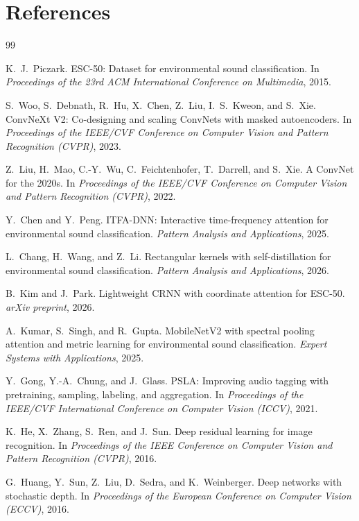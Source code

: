 \documentclass{article}
\begin{document}
\section*{References}
{\small
\begin{thebibliography}{99}

K.~J.~Piczark.
ESC-50: Dataset for environmental sound classification.
In \textit{Proceedings of the 23rd ACM International Conference on Multimedia}, 2015.

S.~Woo, S.~Debnath, R.~Hu, X.~Chen, Z.~Liu, I.~S.~Kweon, and S.~Xie.
ConvNeXt V2: Co-designing and scaling ConvNets with masked autoencoders.
In \textit{Proceedings of the IEEE/CVF Conference on Computer Vision and Pattern Recognition (CVPR)}, 2023.

Z.~Liu, H.~Mao, C.-Y.~Wu, C.~Feichtenhofer, T.~Darrell, and S.~Xie.
A ConvNet for the 2020s.
In \textit{Proceedings of the IEEE/CVF Conference on Computer Vision and Pattern Recognition (CVPR)}, 2022.

Y.~Chen and Y.~Peng.
ITFA-DNN: Interactive time-frequency attention for environmental sound classification.
\emph{Pattern Analysis and Applications}, 2025.

L.~Chang, H.~Wang, and Z.~Li.
Rectangular kernels with self-distillation for environmental sound classification.
\emph{Pattern Analysis and Applications}, 2026.

B.~Kim and J.~Park.
Lightweight CRNN with coordinate attention for ESC-50.
\emph{arXiv preprint}, 2026.

A.~Kumar, S.~Singh, and R.~Gupta.
MobileNetV2 with spectral pooling attention and metric learning for environmental sound classification.
\emph{Expert Systems with Applications}, 2025.

Y.~Gong, Y.-A.~Chung, and J.~Glass.
PSLA: Improving audio tagging with pretraining, sampling, labeling, and aggregation.
In \textit{Proceedings of the IEEE/CVF International Conference on Computer Vision (ICCV)}, 2021.

K.~He, X.~Zhang, S.~Ren, and J.~Sun.
Deep residual learning for image recognition.
In \textit{Proceedings of the IEEE Conference on Computer Vision and Pattern Recognition (CVPR)}, 2016.

G.~Huang, Y.~Sun, Z.~Liu, D.~Sedra, and K.~Weinberger.
Deep networks with stochastic depth.
In \textit{Proceedings of the European Conference on Computer Vision (ECCV)}, 2016.


\end{thebibliography}}
\end{document}
